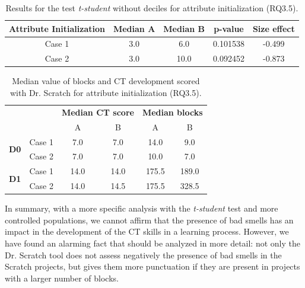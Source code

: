 \begin{table}
 \begin{center}
  \begin{tabular}{|c|c|c|c|c|}
    \hline
    \textbf{Attribute Initialization} & \textbf{Median A} & \textbf{Median B} & \textbf{p-value} & \textbf{Size effect} \\ \hline
    Case 1 & 3.0 & 6.0 & 0.101538 & -0.499 \\ \hline
    Case 2 & 3.0 & 10.0 & 0.092452 & -0.873 \\ \hline
  \end{tabular}
  \caption{Results for the test \textit{t-student} without deciles for attribute initialization (RQ3.5).}
  \label{table:rq3_5_statistical_results}
 \end{center}
\end{table}

\begin{table}
 \begin{center}
  \begin{tabular}{|c|c|c|c|c|c|}
    \cline{3-6}
     \multicolumn{2}{c}{} & 
     \multicolumn{2}{|c|}{\textbf{Median CT score}} & \multicolumn{2}{|c|}{\textbf{Median blocks}} \\ 
     \cline{3-6}
     \multicolumn{2}{c|}{} & A & B & A & B \\ \hline
     \multirow{2}{*}{\textbf{D0}}
     & Case 1 & 7.0 & 7.0 & 14.0 & 9.0 \\
     & Case 2 & 7.0 & 7.0 & 10.0 & 7.0 \\ \hline
     \multirow{2}{*}{\textbf{D1}}
     & Case 1 & 14.0 & 14.0 & 175.5 & 189.0 \\
     & Case 2 & 14.0 & 14.5 & 175.5 & 328.5 \\ \hline
  \end{tabular}
  \caption{Median value of blocks and CT development scored with Dr. Scratch for attribute initialization (RQ3.5).}
  \label{table:rq3_5_statistical_results_median}
 \end{center}
\end{table}

\hfill

In summary, with a more specific analysis with the \textit{t-student} test and more controlled populations, we cannot affirm that the presence of bad smells has an impact in the development of the CT skills in a learning process. However, we have found an alarming fact that should be analyzed in more detail: not only the Dr. Scratch tool does not assess negatively the presence of bad smells in the Scratch projects, but gives them more punctuation if they are present in projects with a larger number of blocks.

